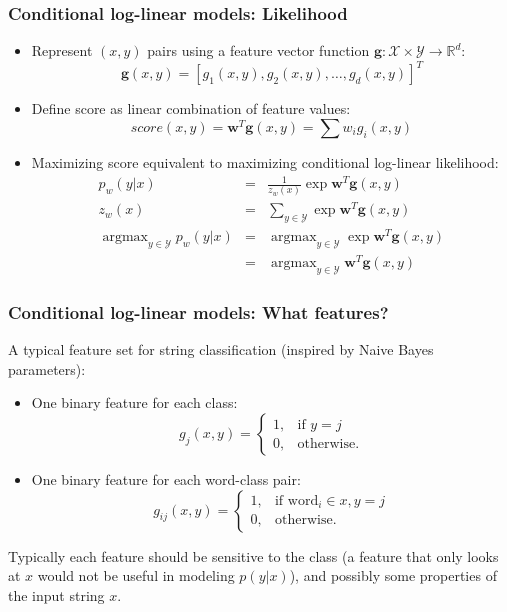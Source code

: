 \documentclass[ignorenonframetext,plain,fleqn]{beamer}
\DeclareMathOperator*{\argmax}{argmax}
\newcommand{\score}{\mathit{score}}
\renewcommand{\vec}{\mathbf}
\begin{document}
\begin{frame}\frametitle{Conditional log-linear models: Likelihood}
\begin{itemize}
\item Represent $(x, y)$ pairs using a feature vector function
  $\vec{g}: \mathcal{X} \times \mathcal{Y} \rightarrow
  \mathbb{R}^d:$ \[
\vec{g}(x, y) = [ g_1(x, y), g_2(x, y), \dots, g_d(x, y) ]^T
\]
\item Define score as linear combination of feature values: \[
  \score(x, y) = \vec{w}^T \vec{g}(x, y) = \sum w_i g_i(x, y)
\]
\item Maximizing score equivalent to maximizing conditional log-linear
  likelihood:
\begin{eqnarray*}
  p_w(y|x) &=& \frac{1}{z_w(x)}\exp \vec{w}^T \vec{g}(x, y) \\
  z_w(x) &=& \sum_{y\in\mathcal{Y}} \exp \vec{w}^T \vec{g}(x, y) \\
  \argmax_{y\in\mathcal{Y}} p_w(y|x)
    &=& \argmax_{y\in\mathcal{Y}} \exp \vec{w}^T \vec{g}(x, y) \\
    &=& \argmax_{y\in\mathcal{Y}} \vec{w}^T \vec{g}(x, y)
\end{eqnarray*}
\end{itemize}
\end{frame}

\begin{frame}\frametitle{Conditional log-linear models: What features?}
A typical feature set for string classification (inspired by Naive
Bayes parameters):\begin{itemize}
\item One binary feature for each class:\[
g_j(x, y) = 
\begin{cases}
1,& \text{if } y=j \\
0,& \text{otherwise.}
\end{cases}
\]
\item One binary feature for each word-class pair:\[
g_{ij}(x, y) = 
\begin{cases}
1,& \text{if word}_i\in x, y=j \\
0,& \text{otherwise.}
\end{cases}
\]
\end{itemize}
Typically each feature should be sensitive to the class (a feature
that only looks at $x$ would not be useful in modeling $p(y|x)$), and
possibly some properties of the input string $x$.
\end{frame}
\end{document}
